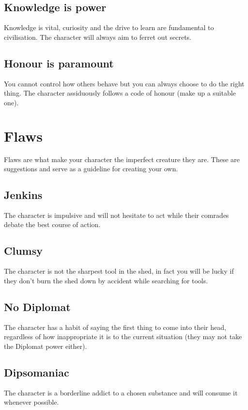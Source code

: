 \documentclass[a4paper,10pt,oneside]{book}
\begin{document}
\subsection{Knowledge is power}
Knowledge is vital, curiosity and the drive to learn are fundamental to civilisation. The character will always aim to ferret out secrets.

\subsection{Honour is paramount}
You cannot control how others behave but you can always choose to do the right thing. The character assiduously follows a code of honour (make up a suitable one).



\section{Flaws}
\label{sec:flaws}
Flaws are what make your character the imperfect creature they are. These are suggestions and serve as a guideline for creating your own.

\subsection{Jenkins}
The character is impulsive and will not hesitate to act while their comrades debate the best course of action.

\subsection{Clumsy}
The character is not the sharpest tool in the shed, in fact you will be lucky if they don't burn the shed down by accident while searching for tools.

\subsection{No Diplomat}
The character has a habit of saying the first thing to come into their head, regardless of how inappropriate it is to the current situation (they may not take the Diplomat power either).

\subsection{Dipsomaniac}
The character is a borderline addict to a chosen substance and will consume it whenever possible.
\end{document}
